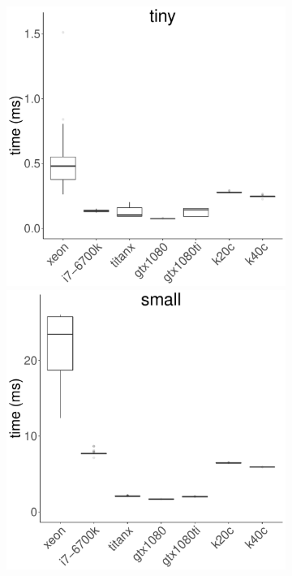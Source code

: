 \documentclass[../document.tex]{subfiles}
\begin{document}
\begin{figure}[t]
	\begin{subfigure}{0.09\textwidth} \label{fig:time-gem} \vspace{5mm}\end{subfigure}
	\begin{subfigure}{0.9\textwidth}
		\includegraphics[width=\plotwidth]{figures/time-results/generate_gem_tiny_boxplot-1}
		\includegraphics[width=\plotwidth]{figures/time-results/generate_gem_small_boxplot-1}

\end{subfigure}
\end{figure}
\end{document}
